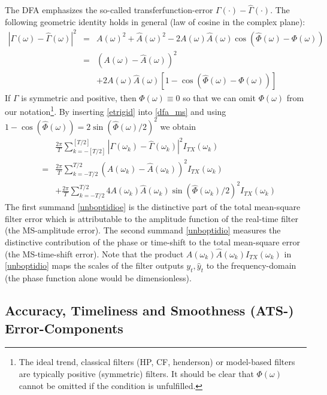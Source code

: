 \documentclass[a4paper]{book}
\begin{document}
The DFA emphasizes the so-called transferfunction-error $\Gamma(\cdot)-\hat{\Gamma}(\cdot)$. The following geometric identity holds in general (law of cosine in the complex plane):
\begin{eqnarray}
|\Gamma(\omega)-\hat{\Gamma}(\omega)|^2&=&A(\omega)^2+\hat{A}(\omega)^2-2A(\omega)
\hat{A}(\omega)\cos\left(\hat{\Phi}(\omega)-\Phi(\omega)\right)\nonumber\\
&=&
(A(\omega)-\hat{A}(\omega))^2\nonumber\\
&&+2A(\omega)\hat{A}(\omega)\left[1-\cos\left(\hat{\Phi}(\omega)-\Phi(\omega)\right)\right]\label{etrigid}
\end{eqnarray}
If $\Gamma$ is symmetric and positive, then \(\Phi(\omega)\equiv
0\) so that we can omit $\Phi(\omega)$ from our notation\footnote{The ideal trend, classical filters (HP, CF, henderson) or model-based filters are typically positive (symmetric) filters. It should be clear that $\Phi(\omega)$ cannot be omitted if the condition is unfulfilled.}. By inserting \ref{etrigid} into \ref{dfa_ms} and using
$1-\cos(\hat{\Phi}(\omega))=2\sin(\hat{\Phi}(\omega)/2)^2$ we obtain
\begin{eqnarray} &&\frac{2\pi}{T}\sum_{k=-[T/2]}^{[T/2]}\left|\Gamma(\omega_k)-\hat{\Gamma}(\omega_k) \right|^2 I_{TX}(\omega_k)\nonumber\\
&=&\frac{2\pi}{ T} \sum_{k=-T/2}^{T/2}
(A(\omega_k)-\hat{A}(\omega_k))^2 I_{TX}(\omega_k)\label{unboptidioe}\\
&&+\frac{2\pi}{ T} \sum_{k=-T/2}^{T/2}
4A(\omega_k)\hat{A}(\omega_k)\sin(\hat{\Phi}(\omega_k)/2)^2
I_{TX}(\omega_k)\label{unboptidio}
\end{eqnarray}
The first summand \ref{unboptidioe} is the distinctive part of the total mean-square filter error
which is attributable to the amplitude function of the real-time filter (the MS-amplitude error).
The second summand \ref{unboptidio} measures the distinctive contribution of the phase or time-shift to
the total mean-square error (the MS-time-shift error). Note that the product
$A(\omega_k)\hat{A}(\omega_k)I_{TX}(\omega_k)$ in \ref{unboptidio} maps the scales of the filter outputs $y_t,\hat{y}_t$ to the frequency-domain (the phase function alone would be dimensionless).



\subsection{Accuracy, Timeliness and Smoothness (ATS-) Error-Components}  \label{ats_section}
\end{document}
